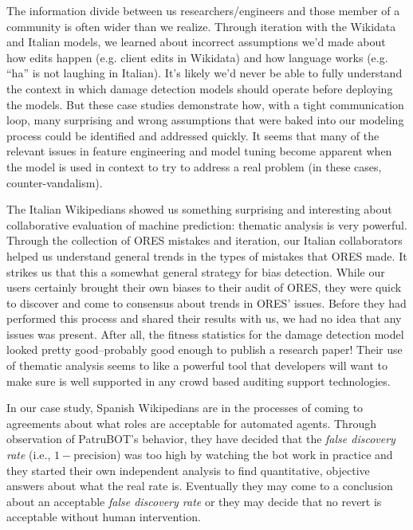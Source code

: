 The information divide between us researchers/engineers and those member of a community is often wider than we realize.  Through iteration with the Wikidata and Italian models, we learned about incorrect assumptions we'd made about how edits happen (e.g. client edits in Wikidata) and how language works (e.g. ``ha'' is not laughing in Italian).  It's likely we'd never be able to fully understand the context in which damage detection models should operate before deploying the models.  But these case studies demonstrate how, with a tight communication loop, many surprising and wrong assumptions that were baked into our modeling process could be identified and addressed quickly.  It seems that many of the relevant issues in feature engineering and model tuning become  apparent when the model is used in context to try to address a real problem (in these cases, counter-vandalism).

The Italian Wikipedians showed us something surprising and interesting about collaborative evaluation of machine prediction: thematic analysis is very powerful.  Through the collection of ORES mistakes and iteration, our Italian collaborators helped us understand general trends in the types of mistakes that ORES made.  It strikes us that this a somewhat general strategy for bias detection.  While our users certainly brought their own biases to their audit of ORES, they were quick to discover and come to consensus about trends in ORES' issues.  Before they had performed this process and shared their results with us, we had no idea that any issues was present.  After all, the fitness statistics for the damage detection model looked pretty good--probably good enough to publish a research paper!  Their use of thematic analysis seems to like a powerful tool that developers will want to make sure is well supported in any crowd based auditing support technologies.

In our case study, Spanish Wikipedians are in the processes of coming to agreements about what roles are acceptable for automated agents.  Through observation of PatruBOT's behavior, they have decided that the \emph{false discovery rate} (i.e., $1 - \text{precision}$) was too high by watching the bot work in practice and they started their own independent analysis to find quantitative, objective answers about what the real rate is.  Eventually they may come to a conclusion about an acceptable \emph{false discovery rate} or they may decide that no revert is acceptable without human intervention.

